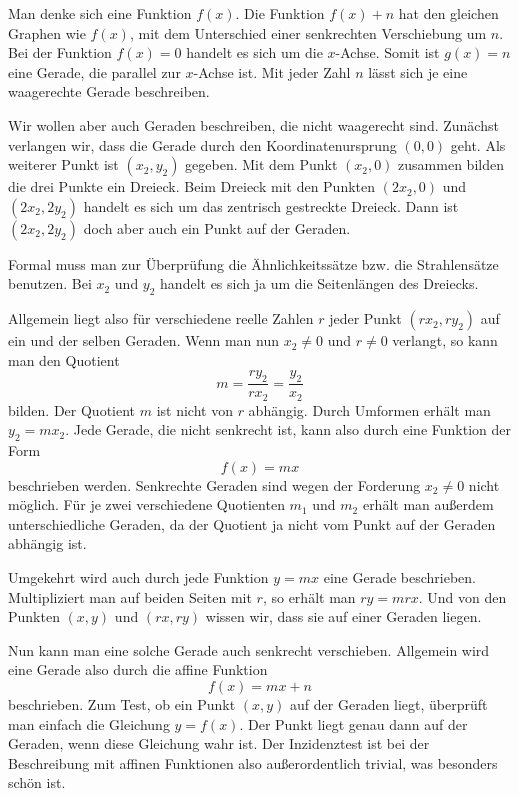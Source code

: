 \documentclass[a4paper,11pt,fleqn,twocolumn,twoside]{article}
\begin{document}
Man denke sich eine Funktion $f(x)$. Die Funktion $f(x)+n$ hat
den gleichen Graphen wie $f(x)$, mit dem Unterschied einer
senkrechten Verschiebung um $n$. Bei der Funktion $f(x)=0$
handelt es sich um die $x$-Achse. Somit ist $g(x)=n$ eine
Gerade, die parallel zur $x$-Achse ist. Mit jeder Zahl $n$ lässt
sich je eine waagerechte Gerade beschreiben.

Wir wollen aber auch Geraden beschreiben, die nicht waagerecht sind.
Zunächst verlangen wir, dass die Gerade durch den Koordinatenursprung $(0,0)$
geht. Als weiterer Punkt ist $(x_2,y_2)$ gegeben. Mit dem Punkt
$(x_2,0)$ zusammen bilden die drei Punkte ein Dreieck. Beim Dreieck
mit den Punkten $(2x_2,0)$ und $(2x_2,2y_2)$ handelt es sich
um das zentrisch gestreckte Dreieck. Dann ist $(2x_2,2y_2)$ doch
aber auch ein Punkt auf der Geraden.

Formal muss man zur Überprüfung die Ähnlichkeitssätze bzw. die
Strahlensätze benutzen. Bei $x_2$ und $y_2$ handelt es sich ja
um die Seitenlängen des Dreiecks.

Allgemein liegt also für verschiedene reelle Zahlen $r$
jeder Punkt $(rx_2,ry_2)$ auf ein und der selben Geraden.
Wenn man nun $x_2\ne 0$ und $r\ne 0$ verlangt, so kann man
den Quotient
\begin{equation}
m = \frac{ry_2}{rx_2} = \frac{y_2}{x_2}
\end{equation}
bilden. Der Quotient $m$ ist nicht von $r$ abhängig.
Durch Umformen erhält man $y_2=mx_2$. Jede Gerade, die nicht
senkrecht ist, kann also durch eine Funktion der Form
\begin{equation}
f(x)=mx
\end{equation}
beschrieben werden. Senkrechte Geraden sind wegen der Forderung
$x_2\ne 0$ nicht möglich. Für je zwei verschiedene Quotienten
$m_1$ und $m_2$ erhält man außerdem unterschiedliche Geraden,
da der Quotient ja nicht vom Punkt auf der Geraden abhängig ist.

Umgekehrt wird auch durch jede
Funktion $y=mx$ eine Gerade beschrieben. Multipliziert man auf
beiden Seiten mit $r$, so erhält man $ry=mrx$. Und von den Punkten
$(x,y)$ und $(rx,ry)$ wissen wir, dass sie auf einer Geraden liegen.

Nun kann man eine solche Gerade auch senkrecht verschieben. Allgemein
wird eine Gerade also durch die affine Funktion
\begin{equation}
f(x) = mx+n
\end{equation}
beschrieben. Zum Test, ob ein Punkt $(x,y)$ auf der Geraden liegt,
überprüft man einfach die Gleichung $y=f(x)$. Der Punkt liegt
genau dann auf der Geraden, wenn diese Gleichung wahr ist. Der
Inzidenztest ist bei der Beschreibung mit affinen Funktionen also
außerordentlich trivial, was besonders schön ist.
\end{document}

